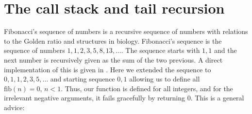 \section{The call stack and tail recursion}
\label{sec:callStack}
Fibonacci's sequence of numbers is a recursive sequence of numbers with relations to the Golden ratio and structures in biology. Fibonacci's sequence is the sequence of numbers $1, 1, 2, 3, 5, 8, 13, \ldots$. The sequence starts with $1, 1$ and the next number is recursively given as the sum of the two previous. A direct implementation of this is given in .
%
%
Here we extended the sequence to $0, 1, 1, 2, 3, 5, \ldots$ and starting sequence $0, 1$ allowing us to define all $\text{fib}(n)=0,\, n < 1$. Thus, our function is defined for all integers, and for the irrelevant negative arguments, it fails gracefully by returning 0. This is a general advice:  

